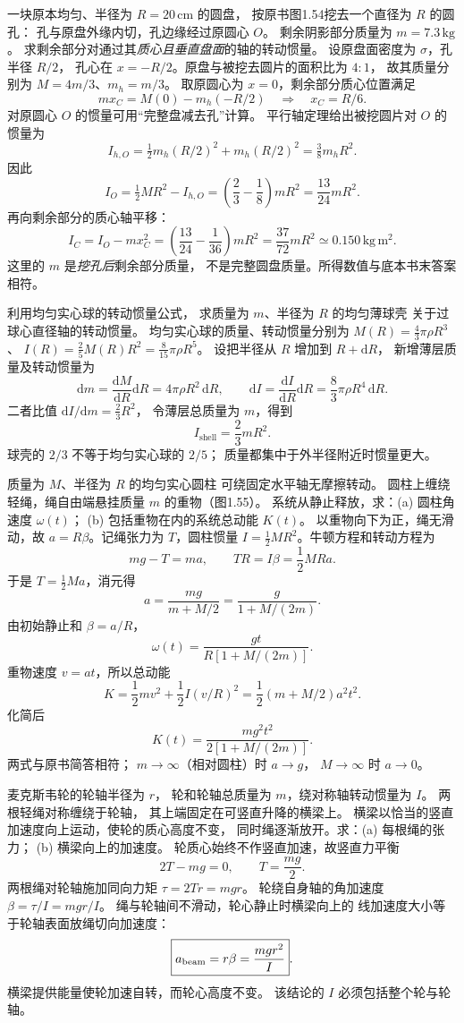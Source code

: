 一块原本均匀、半径为 $R=20\,\mathrm{cm}$ 的圆盘，
按原书图1.54挖去一个直径为 $R$ 的圆孔：
孔与原盘外缘内切，孔边缘经过原圆心 $O$。
剩余阴影部分质量为 $m=7.3\,\mathrm{kg}$。
求剩余部分对通过其\emph{质心且垂直盘面}的轴的转动惯量。
\exsolution
设原盘面密度为 $\sigma$，孔半径 $R/2$，
孔心在 $x=-R/2$。原盘与被挖去圆片的面积比为 $4:1$，
故其质量分别为 $M=4m/3$、$m_h=m/3$。
取原圆心为 $x=0$，剩余部分质心位置满足
\[
mx_C=M(0)-m_h(-R/2)
\quad\Longrightarrow\quad
\boxed{x_C=R/6}.
\]
对原圆心 $O$ 的惯量可用“完整盘减去孔”计算。
平行轴定理给出被挖圆片对 $O$ 的惯量为
\[
I_{h,O}=\tfrac12m_h(R/2)^2+m_h(R/2)^2
=\tfrac38m_h R^2.
\]
因此
\[
I_O=\tfrac12MR^2-I_{h,O}
=\left(\frac23-\frac18\right)mR^2
=\frac{13}{24}mR^2.
\]
再向剩余部分的质心轴平移：
\[
\boxed{I_C=I_O-mx_C^2
=\left(\frac{13}{24}-\frac1{36}\right)mR^2
=\frac{37}{72}mR^2
\simeq0.150\,\mathrm{kg\,m^2}.}
\]
\excheck 这里的 $m$ 是\emph{挖孔后}剩余部分质量，
不是完整圆盘质量。所得数值与底本书末答案相符。

利用均匀实心球的转动惯量公式，
求质量为 $m$、半径为 $R$ 的均匀薄球壳
关于过球心直径轴的转动惯量。
\exsolution
均匀实心球的质量、转动惯量分别为
$M(R)=\frac43\pi\rho R^3$、
$I(R)=\frac25M(R)R^2=\frac8{15}\pi\rho R^5$。
设把半径从 $R$ 增加到 $R+\mathrm dR$，
新增薄层质量及转动惯量为
\[
\mathrm dm=\frac{\mathrm dM}{\mathrm dR}\mathrm dR
=4\pi\rho R^2\,\mathrm dR,\qquad
\mathrm dI=\frac{\mathrm dI}{\mathrm dR}\mathrm dR
=\frac83\pi\rho R^4\,\mathrm dR.
\]
二者比值
$\mathrm dI/\mathrm dm=\frac23R^2$，
令薄层总质量为 $m$，得到
\[
\boxed{I_{\mathrm{shell}}=\frac23mR^2}.
\]
\excheck 球壳的 $2/3$ 不等于均匀实心球的 $2/5$；
质量都集中于外半径附近时惯量更大。

质量为 $M$、半径为 $R$ 的均匀实心圆柱
可绕固定水平轴无摩擦转动。
圆柱上缠绕轻绳，绳自由端悬挂质量 $m$ 的重物（图1.55）。
系统从静止释放，求：(a) 圆柱角速度 $\omega(t)$；
(b) 包括重物在内的系统总动能 $K(t)$。
\exsolution
以重物向下为正，绳无滑动，故
$a=R\beta$。记绳张力为 $T$，圆柱惯量
$I=\frac12MR^2$。牛顿方程和转动方程为
\[
mg-T=ma,\qquad TR=I\beta=\frac12MRa.
\]
于是 $T=\frac12Ma$，消元得
\[
a=\frac{mg}{m+M/2}=\frac{g}{1+M/(2m)}.
\]
由初始静止和 $\beta=a/R$，
\[
\boxed{\omega(t)=\frac{gt}{R[1+M/(2m)]}}.
\]
重物速度 $v=at$，所以总动能
\[
K=\frac12mv^2+\frac12I(v/R)^2
=\frac12(m+M/2)a^2t^2.
\]
化简后
\[
\boxed{K(t)=\frac{mg^2t^2}{2[1+M/(2m)]}}.
\]
\excheck 两式与原书简答相符；
$m\to\infty$（相对圆柱）时 $a\to g$，
$M\to\infty$ 时 $a\to0$。

麦克斯韦轮的轮轴半径为 $r$，
轮和轮轴总质量为 $m$，绕对称轴转动惯量为 $I$。
两根轻绳对称缠绕于轮轴，
其上端固定在可竖直升降的横梁上。
横梁以恰当的竖直加速度向上运动，使轮的质心高度不变，
同时绳逐渐放开。求：(a) 每根绳的张力；
(b) 横梁向上的加速度。
\exsolution
轮质心始终不作竖直加速，故竖直力平衡
\[
2T-mg=0,\qquad
\boxed{T=\frac{mg}{2}}.
\]
两根绳对轮轴施加同向力矩
$\tau=2Tr= mgr$。
轮绕自身轴的角加速度
$\beta=\tau/I=mgr/I$。
绳与轮轴间不滑动，轮心静止时横梁向上的
线加速度大小等于轮轴表面放绳切向加速度：
\[
\boxed{a_{\rm beam}=r\beta=\frac{mgr^2}{I}}.
\]
\excheck 横梁提供能量使轮加速自转，而轮心高度不变。
该结论的 $I$ 必须包括整个轮与轮轴。

